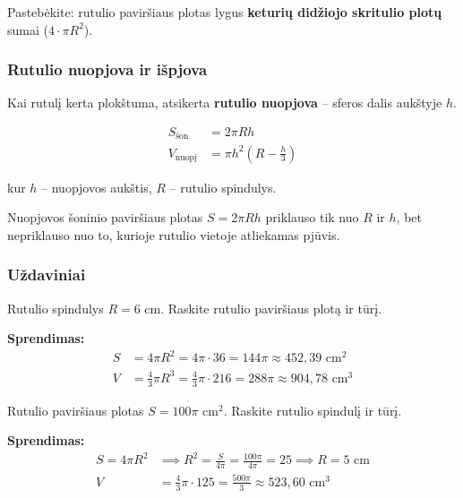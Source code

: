 \noindent Pastebėkite: rutulio paviršiaus plotas lygus \textbf{keturių didžiojo skritulio plotų} sumai ($4 \cdot \pi R^2$).

\subsubsection*{Rutulio nuopjova ir išpjova}

Kai rutulį kerta plokštuma, atsikerta \textbf{rutulio nuopjova} – sferos dalis aukštyje $h$.

\begin{tcolorbox}[title=Rutulio nuopjovos formulės, colback=red!5!white, colframe=red!60!black]
\begin{align}
    S_{\text{šon}} &= 2\pi R h \\
    V_{\text{nuopj}} &= \pi h^2\!\left(R - \frac{h}{3}\right)
\end{align}
\end{tcolorbox}

\noindent kur $h$ – nuopjovos aukštis, $R$ – rutulio spindulys.

\begin{remark}
Nuopjovos šoninio paviršiaus plotas $S = 2\pi Rh$ priklauso tik nuo $R$ ir $h$, bet nepriklauso nuo to, kurioje rutulio vietoje atliekamas pjūvis.
\end{remark}

\subsubsection*{Uždaviniai}

\begin{exercise}
Rutulio spindulys $R = 6$ cm. Raskite rutulio paviršiaus plotą ir tūrį.

\textbf{Sprendimas:}
\begin{align*}
    S &= 4\pi R^2 = 4\pi \cdot 36 = 144\pi \approx 452{,}39 \text{ cm}^2 \\
    V &= \frac{4}{3}\pi R^3 = \frac{4}{3}\pi \cdot 216 = 288\pi \approx 904{,}78 \text{ cm}^3
\end{align*}
\end{exercise}

\begin{exercise}
Rutulio paviršiaus plotas $S = 100\pi$ cm$^2$. Raskite rutulio spindulį ir tūrį.

\textbf{Sprendimas:}
\begin{align*}
    S = 4\pi R^2 &\implies R^2 = \frac{S}{4\pi} = \frac{100\pi}{4\pi} = 25 \implies R = 5 \text{ cm} \\
    V &= \frac{4}{3}\pi \cdot 125 = \frac{500\pi}{3} \approx 523{,}60 \text{ cm}^3
\end{align*}
\end{exercise}

